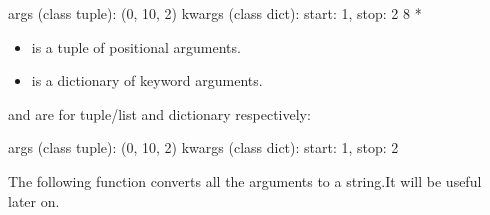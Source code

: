 \documentclass[letterpaper,10pt,english]{sphinxmanual}
\begin{document}
\begin{sphinxVerbatim}[commandchars=\\\{\}]
args (\PYGZlt{}class \PYGZsq{}tuple\PYGZsq{}\PYGZgt{}): (0, 10, 2)
kwargs (\PYGZlt{}class \PYGZsq{}dict\PYGZsq{}\PYGZgt{}): \PYGZob{}\PYGZsq{}start\PYGZsq{}: 1, \PYGZsq{}stop\PYGZsq{}: 2\PYGZcb{}
8 *
\end{sphinxVerbatim}
\begin{itemize}
\item {} 
 is a tuple of positional arguments.

\item {} 
 is a dictionary of keyword arguments.

\end{itemize}

\sphinxcode{\sphinxupquote{*}} and \sphinxcode{\sphinxupquote{**}} are  for tuple/list and dictionary respectively:

\begin{sphinxVerbatim}[commandchars=\\\{\}]
    
     
 
\end{sphinxVerbatim}

\begin{sphinxVerbatim}[commandchars=\\\{\}]
args (\PYGZlt{}class \PYGZsq{}tuple\PYGZsq{}\PYGZgt{}): (0, 10, 2)
kwargs (\PYGZlt{}class \PYGZsq{}dict\PYGZsq{}\PYGZgt{}): \PYGZob{}\PYGZsq{}start\PYGZsq{}: 1, \PYGZsq{}stop\PYGZsq{}: 2\PYGZcb{}
\end{sphinxVerbatim}

The following function converts all the arguments to a string.It will be useful later on.
\end{document}
